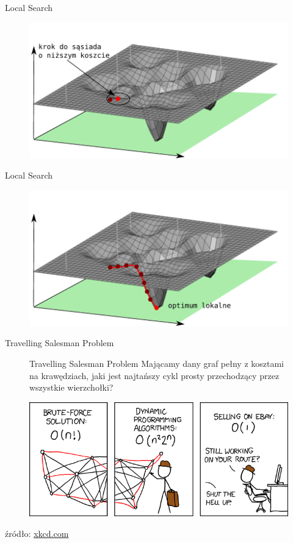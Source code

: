 \documentclass[blue]{beamer}
\begin{document}
\begin{frame}{Local Search}
\begin{figure}
\includegraphics[scale=.7]{ss3.pdf}
\end{figure}
\end{frame}

\begin{frame}{Local Search}
\begin{figure}
\includegraphics[scale=.7]{ss4.pdf}
\end{figure}
\end{frame}

\begin{frame}{Travelling Salesman Problem}
\begin{figure}
\begin{block}{Travelling Salesman Problem}
Mającamy dany graf pełny z kosztami na krawędziach,
jaki jest najtańszy cykl prosty przechodzący
przez wszystkie wierzchołki?
\end{block}
\includegraphics[scale=.45]{travelling_salesman_problem.png}
\end{figure}
źródło: \url{xkcd.com}
\end{frame}
\end{document}
